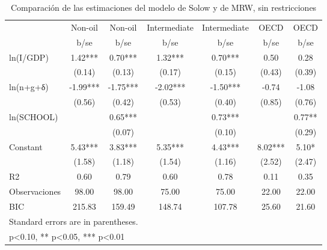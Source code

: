 \begin{table}[htbp]\centering
\def\sym#1{\ifmmode^{#1}\else\(^{#1}\)\fi}
\caption{Comparación de las estimaciones del modelo de Solow y de MRW, sin restricciones}
\begin{tabular}{l*{6}{c}}
\hline\hline
                    &\multicolumn{1}{c}{Non-oil}&\multicolumn{1}{c}{Non-oil}&\multicolumn{1}{c}{Intermediate}&\multicolumn{1}{c}{Intermediate}&\multicolumn{1}{c}{OECD}&\multicolumn{1}{c}{OECD}\\
                    &        b/se   &        b/se   &        b/se   &        b/se   &        b/se   &        b/se   \\
\hline
ln(I/GDP)           &        1.42***&        0.70***&        1.32***&        0.70***&        0.50   &        0.28   \\
                    &      (0.14)   &      (0.13)   &      (0.17)   &      (0.15)   &      (0.43)   &      (0.39)   \\
ln(n+g+δ)           &       -1.99***&       -1.75***&       -2.02***&       -1.50***&       -0.74   &       -1.08   \\
                    &      (0.56)   &      (0.42)   &      (0.53)   &      (0.40)   &      (0.85)   &      (0.76)   \\
ln(SCHOOL)          &               &        0.65***&               &        0.73***&               &        0.77** \\
                    &               &      (0.07)   &               &      (0.10)   &               &      (0.29)   \\
Constant            &        5.43***&        3.83***&        5.35***&        4.43***&        8.02***&        5.10*  \\
                    &      (1.58)   &      (1.18)   &      (1.54)   &      (1.16)   &      (2.52)   &      (2.47)   \\
\hline
R2                  &        0.60   &        0.79   &        0.60   &        0.78   &        0.11   &        0.35   \\
Observaciones       &       98.00   &       98.00   &       75.00   &       75.00   &       22.00   &       22.00   \\
BIC                 &      215.83   &      159.49   &      148.74   &      107.78   &       25.60   &       21.60   \\
\hline\hline
\multicolumn{7}{l}{\footnotesize Standard errors are in parentheses.}\\
\multicolumn{7}{l}{\footnotesize * p<0.10, ** p<0.05, *** p<0.01}\\
\end{tabular}
\end{table}
